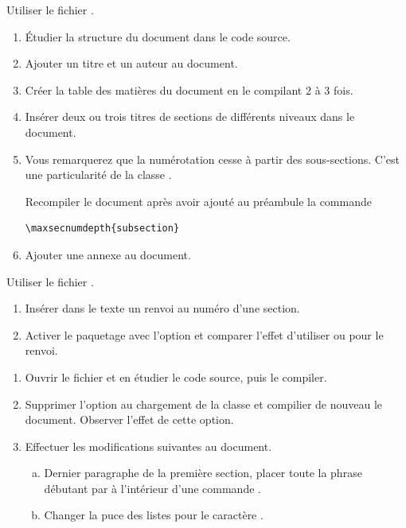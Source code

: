 \begin{exercice}[nosol]
  Utiliser le fichier .
  \begin{enumerate}
  \item Étudier la structure du document dans le code source.
  \item Ajouter un titre et un auteur au document.
  \item Créer la table des matières du document en le compilant 2 à 3
    fois.
  \item Insérer deux ou trois titres de sections de différents niveaux
    dans le document.
  \item Vous remarquerez que la numérotation cesse à partir des
    sous-sections. C'est une particularité de la classe
    .

    Recompiler le document après avoir ajouté au préambule la commande
\begin{lstlisting}
\maxsecnumdepth{subsection}
\end{lstlisting}
  \item Ajouter une annexe au document.
  \end{enumerate}
\end{exercice}

\begin{exercice}[nosol]
  Utiliser le fichier .
  \begin{enumerate}
  \item Insérer dans le texte un renvoi au numéro d'une section.
  \item Activer le paquetage  avec l'option
     et comparer l'effet d'utiliser \cmd{\ref} ou
    \cmd{\autoref} pour le renvoi.
  \end{enumerate}
\end{exercice}

\begin{exercice}
  \begin{enumerate}
  \item Ouvrir le fichier  et en
    étudier le code source, puis le compiler.
  \item Supprimer l'option  au chargement de la classe
    et compilier de nouveau le document. Observer l'effet de cette
    option.
  \item Effectuer les modifications suivantes au document.
    \begin{enumerate}[a)]
    \item Dernier paragraphe de la première section, placer toute la
      phrase débutant par  à l'intérieur
      d'une commande \cmd{\emph}.
    \item Changer la puce des listes pour le caractère \code{\$>\$}.
    \end{enumerate}
  \end{enumerate}
\end{exercice}

